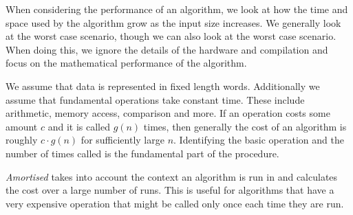 \documentclass[12pt]{report}
\begin{document}
\begin{flushleft}
When considering the performance of an algorithm, we look at how the time and
space used by the algorithm grow as the input size increases. We generally look
at the worst case scenario, though we can also look at the worst case scenario.
When doing this, we ignore the details of the hardware and compilation and focus
on the mathematical performance of the algorithm. \par
We assume that data is represented in fixed length words. Additionally we assume
that fundamental operations take constant time. These include arithmetic, memory
access, comparison and more. If an operation costs some amount \(c\) and it is
called \(g(n)\) times, then generally the cost of an algorithm is roughly
\(c\cdot g(n)\) for sufficiently large \(n\). Identifying the basic operation
and the number of times called is the fundamental part of the procedure. \par
\textit{Amortised} takes into account the context an algorithm is run in and
calculates the cost over a large number of runs. This is useful for algorithms
that have a very expensive operation that might be called only once each time
they are run.

\end{flushleft}
\end{document}

